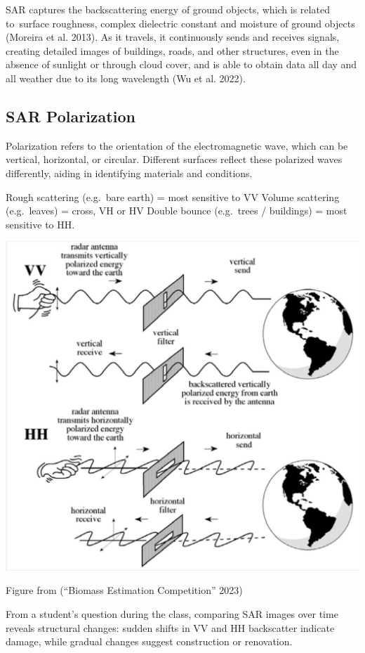 \documentclass[
  letterpaper,
  DIV=11,
  numbers=noendperiod]{scrreprt}
\begin{document}
SAR captures the backscattering energy of ground objects, which is
related to~surface roughness, complex dielectric constant and moisture
of ground objects (Moreira et al. 2013). As it travels, it continuously
sends and receives signals, creating detailed images of buildings,
roads, and other structures, even in the absence of sunlight or through
cloud cover, and is able to obtain data all day and all weather due to
its long wavelength (Wu et al. 2022).

\subsection{SAR Polarization}\label{sar-polarization}

Polarization refers to the orientation of the electromagnetic wave,
which can be vertical, horizontal, or circular. Different surfaces
reflect these polarized waves differently, aiding in identifying
materials and conditions.

Rough scattering (e.g.~bare earth) = most sensitive to VV Volume
scattering (e.g.~leaves) = cross, VH or HV Double bounce (e.g.~trees /
buildings) = most sensitive to HH.

\includegraphics{VVHH.png}

Figure from ({``Biomass Estimation Competition''} 2023)

From a student's question during the class, comparing SAR images over
time reveals structural changes: sudden shifts in VV and HH backscatter
indicate damage, while gradual changes suggest construction or
renovation.
\end{document}
